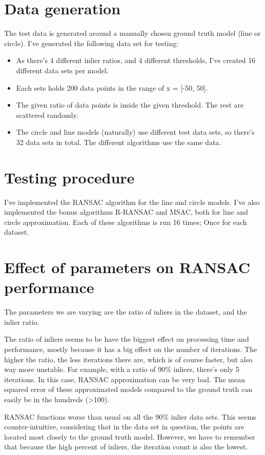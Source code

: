 \section{Data generation}

The test data is generated around a manually chosen ground truth model (line or circle).
I've generated the following data set for testing:
\begin{itemize}
  \item As there's 4 different inlier ratios, and 4 different thresholds, I've
    created 16 different data sets per model.
  \item Each sets holds 200 data points in the range of x = [-50, 50].
  \item The given ratio of data points is inside the given threshold. The rest
    are scattered randomly.
  \item The circle and line models (naturally) use different test data sets, so
    there's 32 data sets in total. The different algorithms use the same data.
\end{itemize}

\section{Testing procedure}

I've implemented the RANSAC algorithm for the line and circle models. I've also
implemented the bonus algorithms R-RANSAC and MSAC, both for line and circle
approximation. Each of these algorithms is run 16 times; Once for each dataset.

\section{Effect of parameters on RANSAC performance}

The parameters we are varying are the ratio of inliers in the dataset, and the
inlier ratio.

The ratio of inliers seems to be have the biggest effect on processing time and
performance, mostly because it has a big effect on the number of iterations.
The higher the ratio, the less iterations there are, which is of course faster,
but also way more unstable. For example, with a ratio of 90\% inliers, there's
only 5 iterations. In this case, RANSAC approximation can be very bad. The mean
squared error of these approximated models compared to the ground truth can
easily be in the hundreds (>100).

RANSAC functions worse than usual on all the 90\% inlier data sets. This seems
counter-intuitive, considering that in the data set in question, the points are
located most closely to the ground truth model. However, we have to remember
that because the high percent of inliers, the iteration count is also the
lowest.

